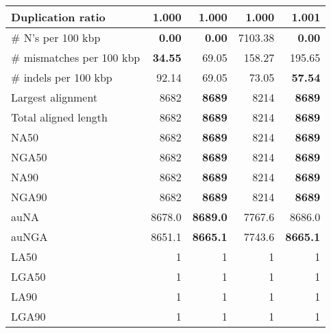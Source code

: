 \documentclass[12pt,a4paper]{article}
\begin{document}
\begin{table}[ht]
\begin{center}
\begin{tabular}{|l*{4}{|r}|}
Duplication ratio & {\bf 1.000} & {\bf 1.000} & {\bf 1.000} & 1.001 \\ \hline
\# N's per 100 kbp & {\bf 0.00} & {\bf 0.00} & 7103.38 & {\bf 0.00} \\ \hline
\# mismatches per 100 kbp & {\bf 34.55} & 69.05 & 158.27 & 195.65 \\ \hline
\# indels per 100 kbp & 92.14 & 69.05 & 73.05 & {\bf 57.54} \\ \hline
Largest alignment & 8682 & {\bf 8689} & 8214 & {\bf 8689} \\ \hline
Total aligned length & 8682 & {\bf 8689} & 8214 & {\bf 8689} \\ \hline
NA50 & 8682 & {\bf 8689} & 8214 & {\bf 8689} \\ \hline
NGA50 & 8682 & {\bf 8689} & 8214 & {\bf 8689} \\ \hline
NA90 & 8682 & {\bf 8689} & 8214 & {\bf 8689} \\ \hline
NGA90 & 8682 & {\bf 8689} & 8214 & {\bf 8689} \\ \hline
auNA & 8678.0 & {\bf 8689.0} & 7767.6 & 8686.0 \\ \hline
auNGA & 8651.1 & {\bf 8665.1} & 7743.6 & {\bf 8665.1} \\ \hline
LA50 & 1 & 1 & 1 & 1 \\ \hline
LGA50 & 1 & 1 & 1 & 1 \\ \hline
LA90 & 1 & 1 & 1 & 1 \\ \hline
LGA90 & 1 & 1 & 1 & 1 \\ \hline
\end{tabular}
\end{center}
\end{table}
\end{document}
